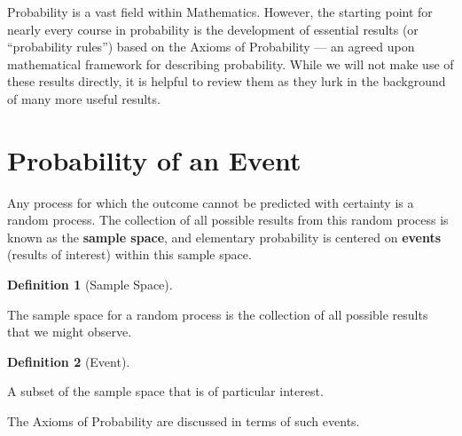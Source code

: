 \documentclass[
  letterpaper,
  DIV=11,
  numbers=noendperiod]{scrreprt}
\theoremstyle{definition}
\theoremstyle{definition}
\newtheorem{definition}{Definition}[chapter]
\theoremstyle{plain}
\theoremstyle{remark}
\begin{document}
\providecommand{\bm}[1]{\mathbf{#1}}
\providecommand{\bs}[1]{\boldsymbol{#1}}
\providecommand{\bbeta}{\bs{\beta}}

\providecommand{\Ell}{\mathcal{L}}
\providecommand{\indep}{\perp\negthickspace\negmedspace\perp}

Probability is a vast field within Mathematics. However, the starting
point for nearly every course in probability is the development of
essential results (or ``probability rules'') based on the Axioms of
Probability --- an agreed upon mathematical framework for describing
probability. While we will not make use of these results directly, it is
helpful to review them as they lurk in the background of many more
useful results.

\hypertarget{probability-of-an-event}{%
\section{Probability of an Event}\label{probability-of-an-event}}

Any process for which the outcome cannot be predicted with certainty is
a random process. The collection of all possible results from this
random process is known as the \textbf{sample space}, and elementary
probability is centered on \textbf{events} (results of interest) within
this sample space.

\begin{definition}[Sample
Space]\protect\hypertarget{def-sample-space}{}\label{def-sample-space}

The sample space for a random process is the collection of all possible
results that we might observe.

\end{definition}

\begin{definition}[Event]\protect\hypertarget{def-event}{}\label{def-event}

A subset of the sample space that is of particular interest.

\end{definition}

The Axioms of Probability are discussed in terms of such events.
\end{document}
